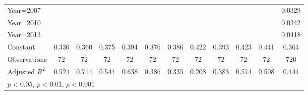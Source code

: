 \begin{table}[htbp]
\begin{tabular}{l*{11}{c}}
Year=2007           &                     &                     &                     &                     &                     &                     &                     &                     &                     &                     &      0.0329\sym{***}\\
Year=2010           &                     &                     &                     &                     &                     &                     &                     &                     &                     &                     &      0.0342\sym{***}\\
Year=2013           &                     &                     &                     &                     &                     &                     &                     &                     &                     &                     &      0.0418\sym{***}\\
Constant            &       0.336\sym{***}&       0.360\sym{***}&       0.375\sym{***}&       0.394\sym{***}&       0.376\sym{***}&       0.386\sym{***}&       0.422\sym{***}&       0.393\sym{***}&       0.423\sym{***}&       0.441\sym{***}&       0.364\sym{***}\\
\hline
Observations        &          72         &          72         &          72         &          72         &          72         &          72         &          72         &          72         &          72         &          72         &         720         \\
Adjusted \(R^{2}\)  &       0.524         &       0.714         &       0.544         &       0.638         &       0.386         &       0.335         &       0.208         &       0.383         &       0.574         &       0.508         &       0.441         \\
\hline\hline
\multicolumn{12}{l}{\footnotesize \sym{*} \(p<0.05\), \sym{**} \(p<0.01\), \sym{***} \(p<0.001\)}\\
\end{tabular}
\end{table}

